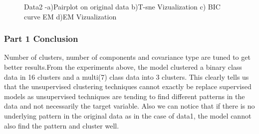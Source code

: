 \documentclass[12pt]{article}
\begin{document}
\begin{figure}[htbp]
    \centering
       \caption{Data2 -a)Pairplot on original data b)T-sne Vizualization c) BIC curve EM d)EM Vizualization }
    \label{fig:foobar}
\end{figure}

\subsubsection*{Part 1 Conclusion}
Number of clusters, number of components and covariance type are tuned to get better results.From the experiments above, the model clustered a binary class data in 16 clusters and a multi(7) class data into 3 clusters. This clearly tells us that the unsupervised clustering techniques   cannot exactly be replace supervised models as unsupervised techniques are tending to find different patterns in the data and not necessarily the target variable. Also we can notice that if there is no underlying pattern in the original data as in the case of data1, the model cannot also find the pattern and cluster well.
\end{document}
